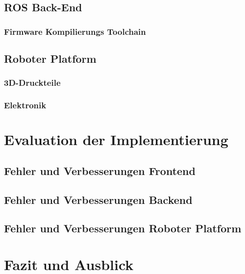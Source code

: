 \documentclass[11pt,twoside,a4paper,titlepage]{article}
\begin{document}
\subsection{ROS Back-End}
\subsubsection{Firmware Kompilierungs Toolchain}



\subsection{Roboter Platform}
\subsubsection{3D-Druckteile}


\subsubsection{Elektronik}


\section{Evaluation der Implementierung}

\subsection{Fehler und Verbesserungen Frontend}

\subsection{Fehler und Verbesserungen Backend}

\subsection{Fehler und Verbesserungen Roboter Platform}


\section{Fazit und Ausblick}
\end{document}
